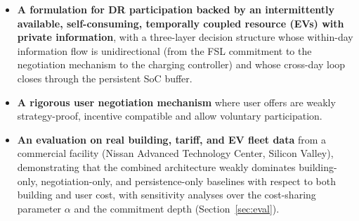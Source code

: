 \begin{itemize} 

\item \textbf{A formulation for DR participation backed by an intermittently available, self-consuming, temporally coupled resource (EVs) with private information}, with a three-layer decision structure whose within-day information flow is unidirectional (from the FSL commitment to the negotiation mechanism to the charging controller) and whose cross-day loop closes through the persistent SoC buffer.


\item \textbf{A rigorous user negotiation mechanism} where user offers are weakly strategy-proof, incentive compatible and allow voluntary participation.

\item \textbf{An evaluation on real building, tariff, and EV fleet data} from a commercial facility (Nissan Advanced Technology Center, Silicon Valley), demonstrating that the combined architecture weakly dominates building-only, negotiation-only, and persistence-only baselines with respect to both building and user cost, with sensitivity analyses over the cost-sharing parameter $\alpha$ \cite{sen2026negotiations} and the commitment depth (Section~\ref{sec:eval}). 

\end{itemize}